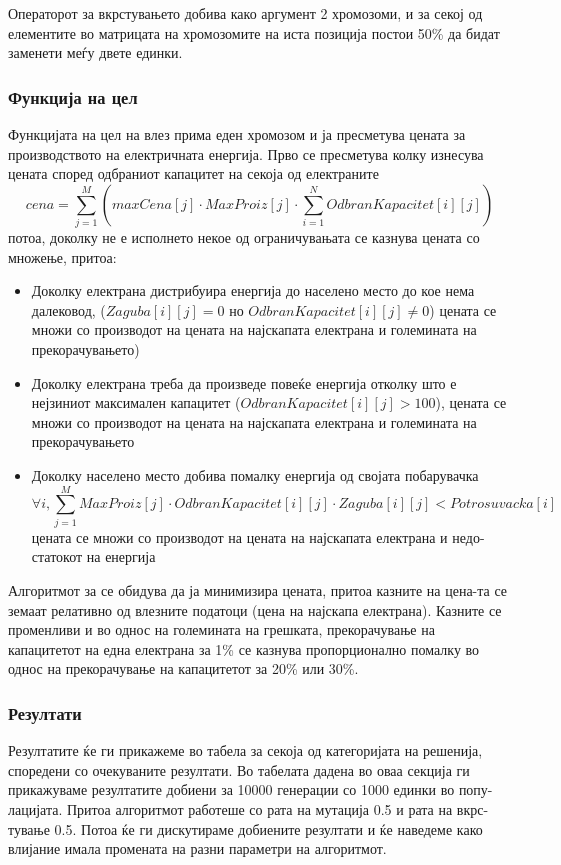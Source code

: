 \documentclass{article}
\begin{document}
Операторот за вкрстувањето добива како аргумент 2 хромозоми, и за секој од елементите во матрицата на хромозомите на иста позиција постои 50\% да бидат заменети меѓу двете единки. 
 
\subsubsection{Функција на цел}

Функцијата на цел на влез прима еден хромозом и ја пресметува цената за производството на електричната енергија. Прво се пресметува колку изнесува цената според одбраниот капацитет на секоја од електраните 
\[ cena = \sum_{j=1}^{M} (maxCena[j] \cdot MaxProiz[j] \cdot  \sum_{i=1}^{N} OdbranKapacitet[i][j] )\]
потоа, доколку не е исполнето некое од ограничувањата се казнува цената со множење, притоа:
\begin{itemize}
\item Доколку електрана дистрибуира енергија до населено место до кое нема далековод, ($Zaguba[i][j] = 0$ но $OdbranKapacitet[i][j] \neq 0$) цената се множи со производот на цената на најскапата електрана и големината на прекорачувањето)  
\item Доколку електрана треба да произведе повеќе енергија отколку што е нејзиниот максимален капацитет ($OdbranKapacitet[i][j] > 100$), цената се множи со производот на цената на најскапата електрана и големината на прекорачувањето 
\item Доколку населено место добива помалку енергија од својата побарувачка \[ \forall i, \sum_{j=1}^{M} MaxProiz[j] \cdot OdbranKapacitet[i][j] \cdot Zaguba[i][j] < Potrosuvacka[i]\] цената се множи со производот на цената на најскапата електрана и недо-статокот на енергија 
\end{itemize}

Алгоритмот за се обидува да ја минимизира цената, притоа казните на цена-та се земаат релативно од влезните податоци (цена на најскапа електрана). Казните се променливи и во однос на големината на грешката, прекорачување на капацитетот на една електрана за 1\% се казнува пропорционално помалку во однос на прекорачување на капацитетот за 20\% или 30\%.

\subsubsection{Резултати}
 
Резултатите ќе ги прикажеме во табела за секоја од категоријата на решенија, споредени со очекуваните резултати. Во табелата дадена во оваа секција ги прикажуваме резултатите добиени за 10000 генерации со 1000 единки во попу-лацијата. Притоа алгоритмот работеше со рата на мутација 0.5 и рата на вкрс-тување 0.5. Потоа ќе ги дискутираме добиените резултати и ќе наведеме како влијание имала промената на разни параметри на алгоритмот. 
\end{document}
